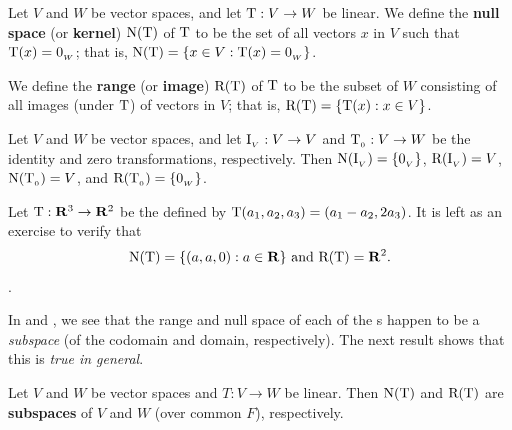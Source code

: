\begin{definition} \label{def 2.2}
Let \(V\) and \(W\) be vector spaces, and let \(\mathrm{T} : V \to W\) be linear.
We define the \textbf{null space} (or \textbf{kernel}) \(\mathrm{N(T)}\) of \(\mathrm{T}\) to be the set of all vectors \(x\) in \(V\) such that \(\mathrm{T}(x) = 0_{_W}\);
that is, \(\mathrm{N(T)} = \{ x \in V : \mathrm{T}(x) = 0_{_W} \}\).

We define the \textbf{range} (or \textbf{image}) \(\mathrm{R(T)}\) of \(\mathrm{T}\) to be the subset of \(W\) consisting of all images (under \(\mathrm{T}\)) of vectors in \(V\);
that is, \(\mathrm{R(T)} = \{ \mathrm{T}(x) : x \in V \}\).
\end{definition}

\begin{example} \label{example 2.1.8}
Let \(V\) and \(W\) be vector spaces, and let \(\mathrm{I}_{_V} : V \to V\) and \(\mathrm{T}_{_0} : V \to W\) be the identity and zero transformations, respectively. Then \(\mathrm{N}(\mathrm{I}_{_V}) = \{ 0_{_V} \}\), \(\mathrm{R}(\mathrm{I}_{_V}) = V\), \(\mathrm{N}(\mathrm{T}_{_0}) = V\), and \(\mathrm{R}(\mathrm{T}_{_0}) = \{ 0_{_W} \}\).
\end{example}

\begin{example} \label{example 2.1.9}
Let \(\mathrm{T} : \mathbf{R}^3 \to \mathbf{R}^2\) be the \LTRAN{} defined by \(\mathrm{T}(a_1, a_2, a_3) = (a_1 - a_2, 2a_3)\).
It is left as an exercise to verify that
\[
    \mathrm{N(T)} = \{ (a, a, 0) : a \in \mathbf{R} \} \text{ and } \mathrm{R(T)} = \mathbf{R}^2.
\].
\end{example}

\begin{remark} \label{remark 2.1.4}
In  and , we see that the range and null space of each of the \LTRAN{}s happen to be a \emph{subspace} (of the codomain and domain, respectively).
The next result shows that this is \emph{true in general}.
\end{remark}

\begin{theorem} \label{thm 2.1}
Let \(V\) and \(W\) be vector spaces and \(T : V \to W\) be linear.
Then \(\mathrm{N(T)}\) and \(\mathrm{R(T)}\) are \textbf{subspaces} of \(V\) and \(W\) (over common \(F\)), respectively.
\end{theorem}

